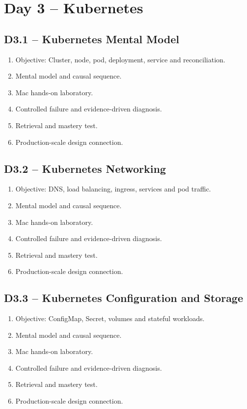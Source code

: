 \documentclass[11pt,a4paper]{book}
\begin{document}
\chapter{Day 3 -- Kubernetes}
\section{D3.1 -- Kubernetes Mental Model}
\begin{enumerate}
\item Objective: Cluster, node, pod, deployment, service and reconciliation.
\item Mental model and causal sequence.
\item Mac hands-on laboratory.
\item Controlled failure and evidence-driven diagnosis.
\item Retrieval and mastery test.
\item Production-scale design connection.
\end{enumerate}
\section{D3.2 -- Kubernetes Networking}
\begin{enumerate}
\item Objective: DNS, load balancing, ingress, services and pod traffic.
\item Mental model and causal sequence.
\item Mac hands-on laboratory.
\item Controlled failure and evidence-driven diagnosis.
\item Retrieval and mastery test.
\item Production-scale design connection.
\end{enumerate}
\section{D3.3 -- Kubernetes Configuration and Storage}
\begin{enumerate}
\item Objective: ConfigMap, Secret, volumes and stateful workloads.
\item Mental model and causal sequence.
\item Mac hands-on laboratory.
\item Controlled failure and evidence-driven diagnosis.
\item Retrieval and mastery test.
\item Production-scale design connection.
\end{enumerate}
\end{document}

